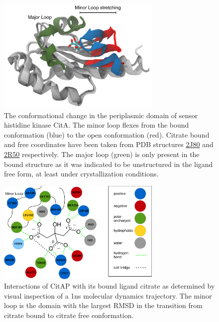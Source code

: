 \documentclass[english, a4paper, 12pt, titlepage, draft]{article}
\newcommand{\PDB}[1]{\href{http://pdb.rcsb.org/pdb/explore/explore.do?structureId=#1}{#1}}
\begin{document}
\begin{figure}
    \centering
    \includegraphics[width=0.7\textwidth]{figures/CitAP_conf_change/CitAP_conf_change.pdf}
    \caption{The conformational change in the periplasmic domain of sensor histidine kinase CitA.
    The minor loop flexes from the bound conformation (blue) to the open conformation (red).
    Citrate bound and free coordinates have been taken from PDB structures \PDB{2J80} and \PDB{2R50} respectively.
    The major loop (green) is only present in the bound structure as it was indicated to be unstructured in the ligand free form, at least under crystallization conditions.}
    \label{fig:CitA_opening}
\end{figure}     



\begin{figure}
    \centering
    \includegraphics[width=0.7\textwidth]{figures/citrate_interactions/citrate_interactions.pdf}
    \caption{Interactions of CitAP with its bound ligand citrate as determined by visual inspection of a 1ns molecular dynamics trajectory. The minor loop is the domain with the largest RMSD in the transition from citrate bound to citrate free conformation.}
    \label{fig:citrate_interactions}
\end{figure}      


\end{document}
